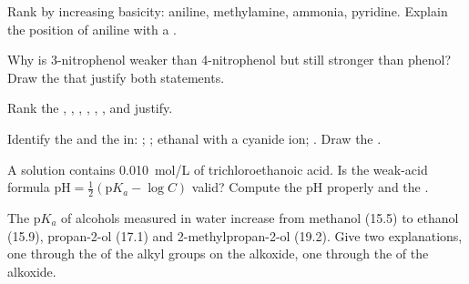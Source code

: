 \begin{exercise}[$\star\star$]\label{exo:b1:electronic-effects:6}
Rank by increasing basicity: aniline, methylamine, ammonia, pyridine.
Explain the position of aniline with a .
\end{exercise}

\begin{exercise}[$\star\star$]\label{exo:b1:electronic-effects:7}
Why is 3-nitrophenol weaker than 4-nitrophenol but still stronger than
phenol? Draw the  that justify both statements.
\end{exercise}

\begin{exercise}[$\star\star$]\label{exo:b1:electronic-effects:8}
Rank the  , , ,
, , , and justify.
\end{exercise}

\begin{exercise}[$\star\star$]\label{exo:b1:electronic-effects:9}
Identify the  and the  in: ;
; ethanal with a cyanide ion; . Draw the
.
\end{exercise}

\begin{exercise}[$\star\star\star$]\label{exo:b1:electronic-effects:10}
A solution contains \qty{0.010}{mol/L} of trichloroethanoic acid. Is the
weak-acid formula $\mathrm{pH} = \frac12(\mathrm{p}K_a - \log C)$ valid?
Compute the pH properly and the .
\end{exercise}

\begin{exercise}[$\star\star\star$]\label{exo:b1:electronic-effects:11}
The $\mathrm{p}K_a$ of alcohols measured in water increase from methanol
(15.5) to ethanol (15.9), propan-2-ol (17.1) and 2-methylpropan-2-ol
(19.2). Give two explanations, one through the  of the
alkyl groups on the alkoxide, one through the  of the alkoxide.
\end{exercise}

